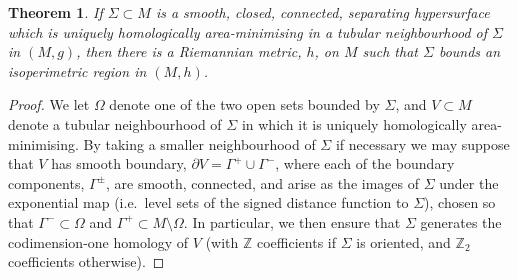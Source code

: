 \documentclass[12pt]{article}
\newtheorem{theorem}{Theorem}
\begin{document}
\begin{theorem}\label{thm: stretching}
    If $\Sigma \subset M$ is a smooth, closed, connected, separating hypersurface which is uniquely homologically area-minimising in a tubular neighbourhood of $\Sigma$ in $(M,g)$, then there is a Riemannian metric, $h$, on $M$ such that $\Sigma$ bounds an isoperimetric region in $(M,h)$.
\end{theorem}
\begin{proof}
    We let $\Omega$ denote one of the two open sets bounded by $\Sigma$, and $V \subset M$ denote a tubular neighbourhood of $\Sigma$ in which it is uniquely homologically area-minimising. By taking a smaller neighbourhood of $\Sigma$ if necessary we may suppose that $V$ has smooth boundary, $\partial V = \Gamma^+ \cup \Gamma^-$, where each of the boundary components, $\Gamma^\pm$, are smooth, connected, and arise as the images of $\Sigma$ under the exponential map (i.e.~level sets of the signed distance function to $\Sigma$), chosen so that $\Gamma^- \subset \Omega$ and $\Gamma^+ \subset M \setminus \Omega$. In particular, we then ensure that $\Sigma$ generates the codimension-one homology of $V$ (with $\mathbb{Z}$ coefficients if $\Sigma$ is oriented, and $\mathbb{Z}_2$ coefficients otherwise).
    
    \bigskip
    

\end{proof}
\end{document}
